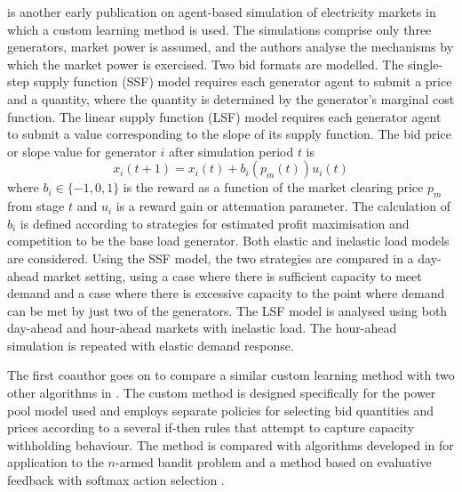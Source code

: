  is another early publication on agent-based simulation of
electricity markets in which a custom learning method is used.  The simulations
comprise only three generators, market power is assumed, and the authors
analyse the mechanisms by which the market power is exercised.  Two bid formats
are modelled.  The single-step supply function (SSF) model requires each
generator agent to submit a price and a quantity, where the quantity is
determined by the generator's marginal cost function.  The linear supply
function (LSF) model requires each generator agent to submit a value
corresponding to the slope of its supply function.  The bid price or slope value for generator
$i$ after simulation period $t$ is
\begin{equation}
x_i(t+1) = x_i(t) + b_i (p_m(t)) u_i(t)
\end{equation}
where $b_i \in \lbrace-1,0,1\rbrace$ is the reward as a function of the market
clearing price $p_m$ from stage $t$ and $u_i$ is a reward gain or attenuation
parameter.  The calculation of $b_i$ is defined according to strategies for
estimated profit maximisation and competition to be the base load generator.
Both elastic and inelastic load models are considered.  Using the SSF
model, the two strategies are compared in a day-ahead market setting,
using a case where there is sufficient capacity to meet demand and a case where
there is excessive capacity to the point where demand can be met by just two of
the generators.  The LSF model is analysed using both day-ahead and
hour-ahead markets with inelastic load.  The hour-ahead simulation is repeated
with elastic demand response.

The first coauthor goes on to compare a similar custom learning method with two
other algorithms in .  The custom method is designed
specifically for the power pool model used and employs separate policies for
selecting bid quantities and prices according to a several if-then rules that
attempt to capture capacity withholding behaviour.  The method is compared
with algorithms developed in  for application to the $n$-armed
bandit problem \cite[\S2.1]{robbins:53,suttonbarto:1998} and a method based on
evaluative feedback with softmax action selection \cite[\S2]{suttonbarto:1998}.

